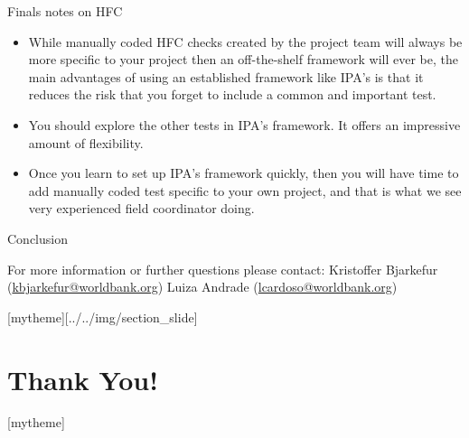 \documentclass[aspectratio=169]{beamer}
\newcommand{\sectionpic}[2]{
	\setbeamertemplate{section page}[mytheme][#2]
	\section{#1}
	\setbeamertemplate{section page}[mytheme]
}
\begin{document}
\begin{frame}{Finals notes on HFC}
	\begin{itemize}
		\item While manually coded HFC checks created by the project team will always be more specific to your project then an off-the-shelf framework will ever be, the main advantages of using an established framework like IPA's is that it reduces the risk that you forget to include a common and important test.
		\item You should explore the other tests in IPA's framework. It offers an impressive amount of flexibility.
		\item Once you learn to set up IPA's framework quickly, then you will have time to add manually coded test specific to your own project, and that is what we see very experienced field coordinator doing.
	\end{itemize}
\end{frame}

\begin{frame}{Conclusion}


\vspace{20mm}
For more information or further questions please contact:
\newline Kristoffer Bjarkefur (\url{kbjarkefur@worldbank.org}) \newline Luiza Andrade (\url{lcardoso@worldbank.org})

\end{frame}

\sectionpic{Thank You!}{../../img/section_slide}
\end{document}
